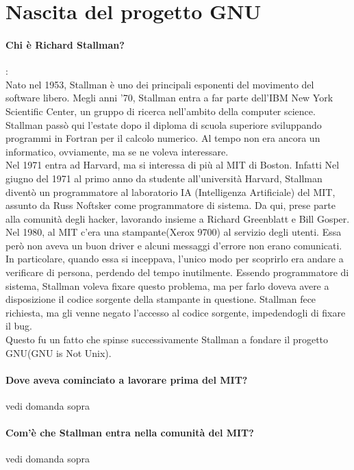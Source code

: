 \documentclass[a4paper]{article}
\begin{document}
	\section{Nascita del progetto GNU}

		\paragraph{Chi è Richard Stallman?}: \\
		Nato nel 1953, Stallman è uno dei principali esponenti del movimento del software libero.
		Megli anni '70, Stallman entra a far parte dell'IBM New York Scientific Center, un gruppo di ricerca nell'ambito della computer science. Stallman passò qui l'estate dopo il diploma di scuola superiore sviluppando programmi in Fortran per il calcolo numerico. Al tempo non era ancora un informatico, ovviamente, ma se ne voleva interessare.\\
		Nel 1971 entra ad Harvard, ma si interessa di più al MIT di Boston. Infatti Nel giugno del 1971 al primo anno da studente all'università Harvard, Stallman diventò un programmatore al laboratorio IA (Intelligenza Artificiale) del MIT, assunto da Russ Noftsker come programmatore di sistema. Da qui, prese parte alla comunità degli hacker, lavorando insieme a Richard Greenblatt e Bill Gosper. \\
		Nel 1980, al MIT c'era una stampante(Xerox 9700) al servizio degli utenti. Essa però non aveva un buon driver e alcuni messaggi d'errore non erano comunicati. In particolare, quando essa si inceppava, l'unico modo per scoprirlo era andare a verificare di persona, perdendo del tempo inutilmente. Essendo programmatore di sistema, Stallman voleva fixare questo problema, ma per farlo doveva avere a disposizione il codice sorgente della stampante in questione. Stallman fece richiesta, ma gli venne negato l'accesso al codice sorgente, impedendogli di fixare il bug.\\
		Questo fu un fatto che spinse successivamente Stallman a fondare il progetto GNU(GNU is Not Unix).
		
		\paragraph{Dove aveva cominciato a lavorare prima del MIT?}
		vedi domanda sopra
		\paragraph{Com'è che Stallman entra nella comunità del MIT?}
		vedi domanda sopra
\end{document}
